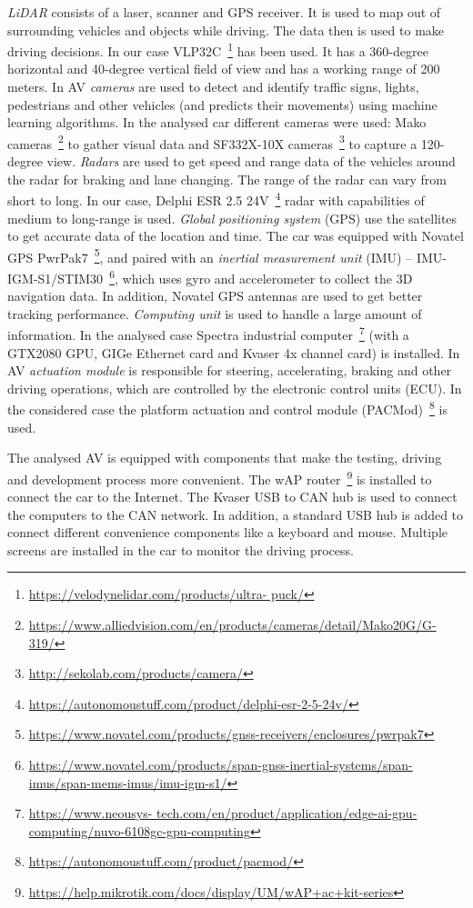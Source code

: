 \documentclass[runningheads]{llncs}
\begin{document}
\textit{LiDAR} consists of a laser, scanner and GPS receiver. It is used to map out of surrounding vehicles and objects while driving. The data then is used to make driving decisions. In our case VLP32C~\footnote{\url{https://velodynelidar.com/products/ultra- puck/}} has been used. It has a 360-degree horizontal and 40-degree vertical field of view and has a working range of 200 meters. In AV \textit{cameras} are used to detect and identify traffic signs, lights, pedestrians and other vehicles (and predicts their movements) using machine learning algorithms. In the analysed car  different cameras were used: Mako cameras~\footnote{\url{https://www.alliedvision.com/en/products/cameras/detail/Mako20G/G- 319/}} %
to gather visual data and SF332X-10X cameras~\footnote{\url{http://sekolab.com/products/camera/}} %
to capture a 120-degree view. \textit{Radars} are used to get speed and range data of the vehicles around the radar for braking and lane changing.
The range of the radar can vary from short to long. In our case, Delphi ESR 2.5 24V~\footnote{\url{https://autonomoustuff.com/product/delphi-esr-2-5-24v/}} %
radar with capabilities of medium to long-range is used.
\textit{Global positioning system} (GPS) use the satellites to get accurate data of the location and time. The car was equipped with Novatel GPS PwrPak7~\footnote{\label{note1}\url{https://www.novatel.com/products/gnss-receivers/enclosures/pwrpak7}}, and paired with an \textit{inertial measurement unit} (IMU) -- IMU-IGM-S1/STIM30~\footnote{\label{note2}\url{https://www.novatel.com/products/span-gnss-inertial-systems/span-imus/span-mems-imus/imu-igm-s1/}}, which uses gyro and accelerometer to collect the 3D navigation data. In addition, Novatel GPS antennas are used to get better tracking performance. \textit{Computing unit} is used to handle a large amount of information. In the analysed case Spectra industrial computer~\footnote{\url{https://www.neousys- tech.com/en/product/application/edge-ai-gpu-computing/nuvo-6108gc-gpu-computing}} (with a GTX2080 GPU, GIGe Ethernet card and Kvaser 4x channel card) is installed. In AV \textit{actuation module} is responsible for steering, accelerating, braking and other driving operations, which are controlled by the electronic control units (ECU). In the considered case the platform actuation and control module (PACMod)~\footnote{\url{ https://autonomoustuff.com/product/pacmod/}} is used. 

The analysed AV is equipped with components that make the testing, driving and development process more convenient. The wAP router~\footnote{\url{https://help.mikrotik.com/docs/display/UM/wAP+ac+kit-series}} is installed to connect the car to the Internet. The Kvaser USB to CAN hub is used to connect the computers to the CAN network. In addition, a standard USB hub is added to connect different convenience components like a keyboard and mouse. Multiple screens are installed in the car to monitor the driving process.
\end{document}
